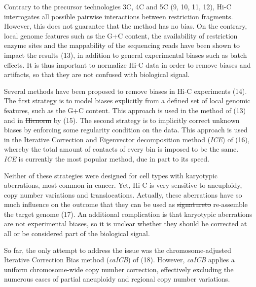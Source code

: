\documentclass[a4,center,fleqn]{NAR}
\providecommand{\DIFadd}[1]{{\protect\color{blue}\uwave{#1}}} %
\providecommand{\DIFdel}[1]{{\protect\color{red}\sout{#1}}}                      %
\providecommand{\DIFaddbegin}{} %
\providecommand{\DIFaddend}{} %
\providecommand{\DIFdelbegin}{} %
\providecommand{\DIFdelend}{} %
\begin{document}
Contrary to the precursor technologies 3C, 4C and 5C
(9, 10, 11, 12), Hi-C interrogates all possible
pairwise interactions between restriction fragments. However, this does
not guarantee that the method has no bias.  On the contrary, local genome
features such as the G+C content, the availability of restriction enzyme
sites and the mappability of the sequencing reads have been shown to
impact the results (13), in addition to general
experimental biases such as batch effects. It is thus important to
normalize Hi-C data in order to remove biases and artifacts, so that they
are not confused with biological signal.

Several methods have been proposed to remove biases in Hi-C experiments
(14). The first strategy is to model biases
explicitly from a defined set of local genomic features, such as the G+C
content. This approach is used in the method of
(13) and in \DIFdelbegin \DIFdel{Hicnorm }\DIFdelend \DIFaddbegin \DIFadd{HiCNorm }\DIFaddend by (15).
The second strategy is to implicitly correct unknown biases by enforcing
some regularity condition on the data. This approach is used in the
Iterative Correction and Eigenvector decomposition method (\textit{ICE})
of (16), whereby the total amount of contacts of
every bin is imposed to be the same. \textit{ICE} is currently the most
popular method, due in part to its speed.

Neither of these strategies were designed for cell types with karyotypic
aberrations, most common in cancer. Yet, Hi-C is very sensitive to
aneuploidy, copy number variations and translocations. Actually, these
aberrations have so much influence on the outcome that they can be used as
\DIFdelbegin \DIFdel{signatureto }\DIFdelend \DIFaddbegin \DIFadd{signatures to }\DIFaddend re-assemble the target genome (17). An
additional complication is that karyotypic aberrations are not
experimental biases, so it is unclear whether they should be corrected at
all or be considered part of the biological signal.

\enlargethispage{-65.1pt}

So far, the only attempt to address the issue was the chromosome-adjusted
Iterative Correction Bias method (\textit{caICB}) of
(18). However, \textit{caICB} applies a uniform
chromosome-wide copy number correction, effectively excluding the numerous
cases of partial aneuploidy and regional copy number variations.
\end{document}
